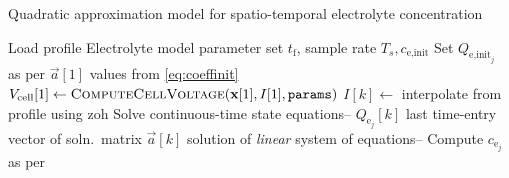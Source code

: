 
\begin{algorithm}[!htbp]
    \caption{Quadratic approximation model for spatio-temporal electrolyte concentration}\label{alg:quadraticce}
    \begin{algorithmic}[1]
        \Require Load profile 
        \Require Electrolyte model parameter set  
        \Userdata $ t_\text{f}$,  sample rate $T_s, c_\text{e,init}$
        \State Set $Q_{\text{e,init}_j}$ as per 
        \State $\vec{a}[1]$ \gets values from \cref{eq:coeffinit}
        \State $V_\text{cell}[1] \gets \textsc{ComputeCellVoltage}(\textbf{x}[1],I[1],\texttt{params})$ 
        \State $I[k] \gets $ interpolate from profile using \gls{zoh}
        \State Solve continuous-time state equations-- 
        \State $Q_{\text{e}_j}[k]$ \gets last time-entry  vector of soln.\  matrix 
        \State $\vec{a}[k]$ \gets solution of \emph{linear} system of equations-- 
        \State Compute $c_{\text{e}_j}$ as per  
        \EndFor
        \EndFunction
    \end{algorithmic}
\end{algorithm}
